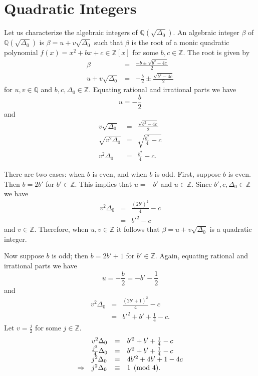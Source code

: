 \documentclass{ucalgthes1}
\newcommand{\ZZ}{\mathbb{Z}}
\newcommand{\QQ}{\mathbb{Q}}
\begin{document}
\bigbreak
\section{Quadratic Integers}
Let us characterize the algebraic integers of $\QQ(\sqrt{\Delta_0})$.  An algebraic integer $\beta$ of $\QQ(\sqrt{\Delta_0})$ is $\beta = u+v \sqrt{\Delta_0}$ such that $\beta$ is the root of a monic quadratic polynomial $f(x) = x^2+bx+c \in \ZZ[x]$ for some $b,c \in \ZZ$.  The root is given by
\begin{eqnarray*}
	\beta & = & \frac{-b \pm \sqrt{b^2-4c}}{2} \\
	u + v \sqrt{\Delta_0} & = & -\frac{b}{2} \pm \frac{\sqrt{b^2-4c}}{2}
\end{eqnarray*}
for $u,v \in \QQ$ and $b,c,\Delta_0 \in \ZZ$.
Equating rational and irrational parts we have
\[
	u = -\frac{b}{2}
\]
and
\begin{eqnarray*}
	v \sqrt{\Delta_0} & = & \frac{\sqrt{b^2 -4c}}{2} \\
	\sqrt{v^2 \Delta_0} & = & \sqrt{\frac{b^2}{4} - c} \\
	v^2 \Delta_0 & = & \frac{b^2}{4} - c.
\end{eqnarray*}


There are two cases: when $b$ is even, and when $b$ is odd.  First, suppose $b$ is even.  Then $b=2b'$ for $b' \in \ZZ$.  This implies that $u = -b'$ and $u \in \ZZ$.  Since $b', c, \Delta_0 \in \ZZ$ we have
\begin{eqnarray*}
	v^2 \Delta_0 & = & \frac{(2b')^2}{4} - c \\
	& = & b'^2 - c
\end{eqnarray*}
and $v \in \ZZ$.  Therefore, when $u, v \in \ZZ$ it follows that $\beta = u + v \sqrt{\Delta_0}$ is a quadratic integer.

\bigbreak
Now suppose $b$ is odd; then $b=2b' + 1$ for $b' \in \ZZ$.  Again, equating rational and irrational parts we have
\[
	u = - \frac{b}{2} = -b' - \frac{1}{2}
\]
and
\begin{eqnarray*}
	v^2 \Delta_0 & = & \frac{(2b'+1)^2}{4} - c \\
	& = & b'^2 + b' + \frac{1}{4} -c.
\end{eqnarray*}
Let $v = \frac{j}{2}$ for some $j \in \ZZ$.  
\begin{equation*}
\begin{array}{l l l l}
	& v^2 \Delta_0 & = & b'^2 + b' + \frac{1}{4} -c \\
	& \frac{j^2}{4} \Delta_0 & = & b'^2 + b' + \frac{1}{4} -c \\
	& j^2 \Delta_0 & = & 4b'^2 + 4b' + 1 - 4c \\
	\Rightarrow & j^2 \Delta_0 & \equiv & 1 \pmod 4.
\end{array}
\end{equation*}
\end{document}

